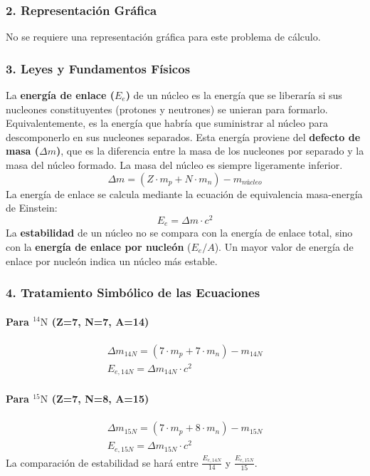\subsubsection*{2. Representación Gráfica}
No se requiere una representación gráfica para este problema de cálculo.

\subsubsection*{3. Leyes y Fundamentos Físicos}
La \textbf{energía de enlace ($E_e$)} de un núcleo es la energía que se liberaría si sus nucleones constituyentes (protones y neutrones) se unieran para formarlo. Equivalentemente, es la energía que habría que suministrar al núcleo para descomponerlo en sus nucleones separados.
Esta energía proviene del \textbf{defecto de masa ($\Delta m$)}, que es la diferencia entre la masa de los nucleones por separado y la masa del núcleo formado. La masa del núcleo es siempre ligeramente inferior.
$$\Delta m = (Z \cdot m_p + N \cdot m_n) - m_{núcleo}$$
La energía de enlace se calcula mediante la ecuación de equivalencia masa-energía de Einstein:
$$E_e = \Delta m \cdot c^2$$
La \textbf{estabilidad} de un núcleo no se compara con la energía de enlace total, sino con la \textbf{energía de enlace por nucleón} ($E_e/A$). Un mayor valor de energía de enlace por nucleón indica un núcleo más estable.

\subsubsection*{4. Tratamiento Simbólico de las Ecuaciones}
\paragraph*{Para ${}^{14}\text{N}$ (Z=7, N=7, A=14)}
\begin{gather}
    \Delta m_{14N} = (7 \cdot m_p + 7 \cdot m_n) - m_{14N} \\
    E_{e, 14N} = \Delta m_{14N} \cdot c^2
\end{gather}
\paragraph*{Para ${}^{15}\text{N}$ (Z=7, N=8, A=15)}
\begin{gather}
    \Delta m_{15N} = (7 \cdot m_p + 8 \cdot m_n) - m_{15N} \\
    E_{e, 15N} = \Delta m_{15N} \cdot c^2
\end{gather}
La comparación de estabilidad se hará entre $\frac{E_{e, 14N}}{14}$ y $\frac{E_{e, 15N}}{15}$.

